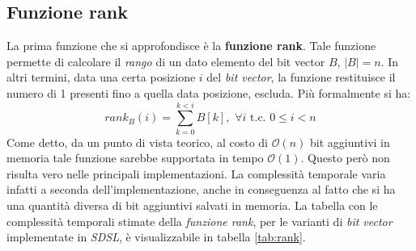 \subsection{Funzione rank}
La prima funzione che si approfondisce è la \textbf{funzione rank}. Tale
funzione permette di calcolare il \textit{rango} di un dato elemento del
bit vector $B$, $|B|=n$. In altri termini, data una certa posizione $i$ del
\textit{bit vector}, la funzione restituisce il numero di 1 presenti fino a
quella data posizione, escluda. Più formalmente si ha:
\[rank_B(i)=\sum_{k=0}^{k<i}B[k],\,\,\forall i \mbox{ t.c. } 0\leq i < n\]
Come detto, da un punto di vista teorico, al costo di $\mathcal{O}(n)$ bit
aggiuntivi in memoria tale funzione sarebbe supportata in tempo
$\mathcal{O}(1)$. Questo però non risulta vero nelle principali
implementazioni. La complessità temporale varia infatti a seconda
dell'implementazione, anche in conseguenza al fatto che si ha una quantità
diversa di bit aggiuntivi salvati in memoria.
La tabella con le complessità temporali stimate della \textit{funzione rank},
per le varianti di \textit{bit vector} implementate in \textit{SDSL}, è
visualizzabile in tabella \ref{tab:rank}.

